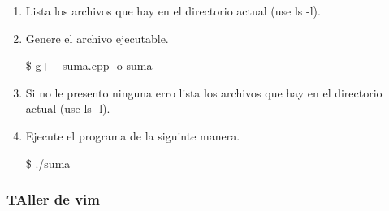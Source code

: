 \documentclass[a4paper,12pt,spanish]{article}
\begin{document}
\begin{enumerate}
  \item Lista los archivos que hay en el directorio actual (use ls
  -l).

  \item Genere el archivo ejecutable.

  
    \begin{tcolorbox}[colback=gray!5]
    \$ g++   suma.cpp   -o   suma
  \end{tcolorbox}

  \item Si no le presento ninguna erro lista los archivos que hay en el directorio actual (use ls
    -l).

  \item Ejecute el programa de la siguinte manera.
    
    \begin{tcolorbox}[colback=gray!5]
    \$ ./suma
  \end{tcolorbox}

\end{enumerate}


\subsubsection{TAller de vim}
\label{sec:taller-de-vim}
\end{document}
